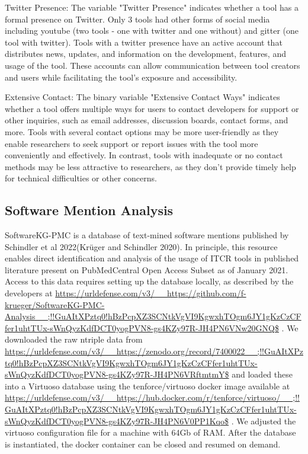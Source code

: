 Twitter Presence: The variable "Twitter Presence" indicates whether a tool has a formal presence on Twitter. Only 3 tools had other forms of social media including youtube (two tools - one with twitter and one without) and gitter (one tool with twitter). Tools with a twitter presence have an active account that distributes news, updates, and information on the development, features, and usage of the tool. These accounts can allow communication between tool creators and users while facilitating the tool's exposure and accessibility.

Extensive Contact: The binary variable "Extensive Contact Ways" indicates whether a tool offers multiple ways for users to contact developers for support or other inquiries, such as email addresses, discussion boards, contact forms, and more. Tools with several contact options may be more user-friendly as they enable researchers to seek support or report issues with the tool more conveniently and effectively. In contrast, tools with inadequate or no contact methods may be less attractive to researchers, as they don't provide timely help for technical difficulties or other concerns.

\subsection{Software Mention Analysis}

SoftwareKG-PMC is a database of text-mined software mentions published by Schindler et al 2022(Krüger and Schindler 2020). In principle, this resource enables direct identification and analysis of the usage of ITCR tools in published literature present on PubMedCentral Open Access Subset as of January 2021. Access to this data requires setting up the database locally, as described by the developers at \url{https://urldefense.com/v3/__https://github.com/f-krueger/SoftwareKG-PMC-Analysis__;!!GuAItXPztq0!hBzPcpXZ3SCNtkVgVI9KgwxhTOgm6JY1gKzCzCFfer1uhtTUx-sWnQyzKdfDCT0yogPVN8-gs4KZy97R-JH4PN6VNw20GNQ$} . We downloaded the raw ntriple data from \url{https://urldefense.com/v3/__https://zenodo.org/record/7400022__;!!GuAItXPztq0!hBzPcpXZ3SCNtkVgVI9KgwxhTOgm6JY1gKzCzCFfer1uhtTUx-sWnQyzKdfDCT0yogPVN8-gs4KZy97R-JH4PN6VRftmtmY$}  and loaded these into a Virtuoso database using the tenforce/virtuoso docker image available at \url{https://urldefense.com/v3/__https://hub.docker.com/r/tenforce/virtuoso/__;!!GuAItXPztq0!hBzPcpXZ3SCNtkVgVI9KgwxhTOgm6JY1gKzCzCFfer1uhtTUx-sWnQyzKdfDCT0yogPVN8-gs4KZy97R-JH4PN6V0PP1Kqo$} . We adjusted the virtuoso configuration file for a machine with 64Gb of RAM. After the database is instantiated, the docker container can be closed and resumed on demand.

